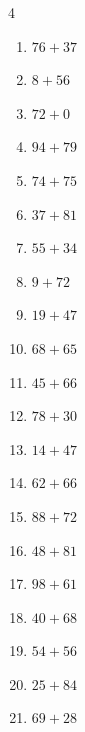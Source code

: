 \begin{multicols}{4}
\begin{enumerate}
  \item $76+37$
        \phantom{$=113$}

  \item $8+56$
        \phantom{$=64$}

  \item $72+0$
        \phantom{$=72$}

  \item $94+79$
        \phantom{$=173$}

  \item $74+75$
        \phantom{$=149$}

  \item $37+81$
        \phantom{$=118$}

  \item $55+34$
        \phantom{$=89$}

  \item $9+72$
        \phantom{$=81$}

  \item $19+47$
        \phantom{$=66$}

  \item $68+65$
        \phantom{$=133$}

  \item $45+66$
        \phantom{$=111$}

  \item $78+30$
        \phantom{$=108$}

  \item $14+47$
        \phantom{$=61$}

\columnbreak %

  \item $62+66$
        \phantom{$=128$}

  \item $88+72$
        \phantom{$=160$}

  \item $48+81$
        \phantom{$=129$}

  \item $98+61$
        \phantom{$=159$}

  \item $40+68$
        \phantom{$=108$}

  \item $54+56$
        \phantom{$=110$}

  \item $25+84$
        \phantom{$=109$}

  \item $69+28$
        \phantom{$=97$}


\end{enumerate}
\end{multicols}
